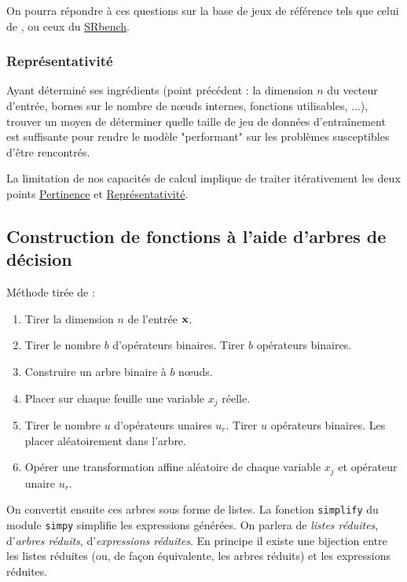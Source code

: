 \documentclass[a4paper,12pt]{article}
\begin{document}
On pourra répondre à ces questions sur la base de jeux de référence tels que celui de \cite{udrescu}, ou ceux du \href{https://cavalab.org/srbench/}{SRbench}.

\subsubsection{{\color{blue}Représentativité}}
\label{sec:repr}

Ayant déterminé ses ingrédients (point précédent : la dimension $n$ du vecteur d'entrée, bornes sur le nombre de nœuds internes, fonctions utilisables, ...), trouver un moyen de déterminer quelle taille de jeu de données d'entraînement est suffisante pour rendre le modèle "performant" sur les problèmes susceptibles d'être rencontrés.

\medskip

La limitation de nos capacités de calcul implique de traiter itérativement les deux points \hyperref[sec:pert]{Pertinence} et 
\hyperref[sec:repr]{Représentativité}.

\subsection{{\color{mygreen}Construction de fonctions à l'aide d'arbres de décision}}

Méthode tirée de \cite{lample} :
\begin{enumerate}
    \item Tirer la dimension $n$ de l'entrée $\vb x$.
    \item Tirer le nombre $b$ d'opérateurs binaires. Tirer $b$ opérateurs binaires.
    \item Construire un arbre binaire à $b$ nœuds.
    \item Placer sur chaque feuille une variable $x_j$ réelle.
    \item Tirer le nombre $u$ d'opérateurs unaires $u_r$. Tirer $u$ opérateurs binaires. Les placer aléatoirement dans l'arbre.
    \item Opérer une transformation affine aléatoire de chaque variable $x_j$ et opérateur unaire $u_r$.
\end{enumerate}

\medskip

On convertit ensuite ces arbres sous forme de listes. La fonction \texttt{simplify} du module \texttt{simpy} simplifie les expressions générées. On parlera de \emph{listes réduites}, d'\emph{arbres réduits}, d'\emph{expressions réduites}. En principe il existe une bijection entre les listes réduites (ou, de façon équivalente, les arbres réduits) et les expressions réduites.
\end{document}
